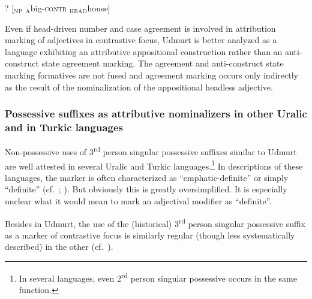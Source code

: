 \begin{exe} \label{udmurt notapposition}
\ex ? [$_{\text{NP}}$ $_{\text{A}}$big-\textsc{contr} $_{\text{HEAD}}$house$]$
\end{exe}
Even if head\hyp{}driven number and case agreement is involved in attribution marking of adjectives in contrastive focus, Udmurt is better analyzed as a language exhibiting an attributive appositional construction rather than an anti\hyp{}construct state agreement marking. The agreement and anti\hyp{}construct state marking formatives are not fused and agreement marking occurs only indirectly as the result of the nominalization of the appositional headless adjective.

\subsubsection[Possessive suffixes as attributive nominalizers]{Possessive suffixes as attributive nominalizers in other Uralic and in Turkic languages}
Non-possessive uses of 3\textsuperscript{rd} person singular possessive suffixes similar to Udmurt are well attested in several Uralic and Turkic languages.\footnote{In several languages, even 2\textsuperscript{rd} person singular possessive occurs in the same function.} In descriptions of these languages, the marker is often characterized as “emphatic-definite” or simply “definite” (cf.~\citealt[148]{tauli1966}; \citealt{kunnap2004}). But obviously this is greatly oversimplified. It is especially unclear what it would mean to mark an adjectival modifier as “definite”.

Besides in Udmurt, the use of the (historical) 3\textsuperscript{rd} person singular possessive suffix as a marker of contrastive focus is similarly regular (though less systematically described) in the other  (cf.~\citealt[67]{serebrennikov1963}).%

